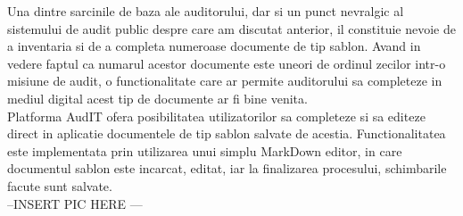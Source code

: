 	Una dintre sarcinile de baza ale auditorului, dar si un punct nevralgic al sistemului de audit public despre care am discutat anterior, il constituie nevoie de a inventaria si de a completa numeroase documente de tip sablon. Avand in vedere faptul ca numarul acestor documente este uneori de ordinul zecilor intr-o misiune de audit, o functionalitate care ar permite auditorului sa completeze in mediul digital acest tip de documente ar fi bine venita.\\
	Platforma AudIT ofera posibilitatea utilizatorilor sa completeze si sa editeze direct in aplicatie documentele de tip sablon salvate de acestia. Functionalitatea este implementata prin utilizarea unui simplu 
	MarkDown editor, in care documentul sablon este incarcat, editat, iar la finalizarea procesului, schimbarile facute sunt salvate.\\
	
	--INSERT PIC HERE ---\\
	
